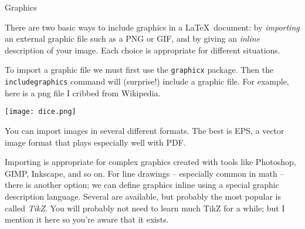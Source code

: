 \documentclass{article}
\begin{document}
\begin{center}
\Large Graphics
\end{center}

There are two basic ways to include graphics in a \LaTeX\ document: by \emph{importing} an external graphic file such as a PNG or GIF, and by giving an \emph{inline} description of your image. Each choice is appropriate for different situations.

To import a graphic file we must first use the \texttt{graphicx} package. Then the \texttt{includegraphics} command will (surprise!) include a graphic file. For example, here is a png file I cribbed from Wikipedia.

\begin{center}
\texttt{[image: dice.png]}
\end{center}

You can import images in several different formats. The best is EPS, a vector image format that plays especially well with PDF.

Importing is appropriate for complex graphics created with tools like Photoshop, GIMP, Inkscape, and so on. For line drawings -- especially common in math -- there is another option; we can define graphics inline using a special graphic description language. Several are available, but probably the most popular is called \emph{TikZ}. You will probably not need to learn much TikZ for a while; but I mention it here so you're aware that it exists.
\end{document}
